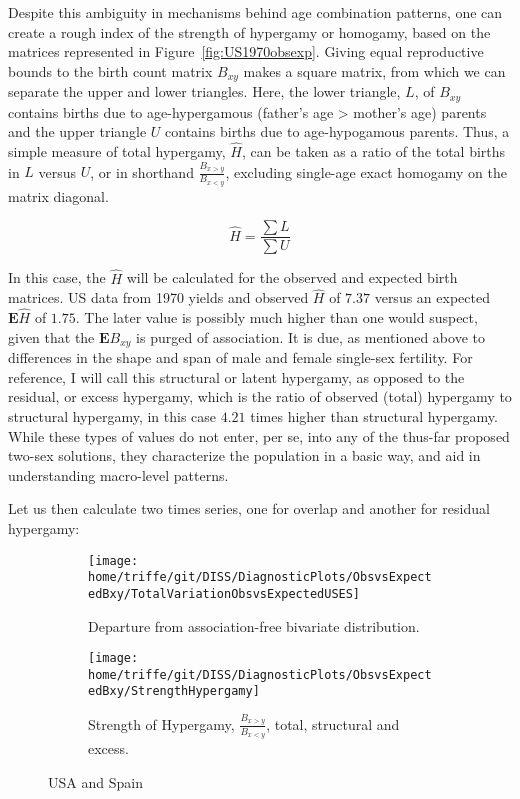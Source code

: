 Despite this ambiguity in mechanisms behind age combination patterns, one can
create a rough index of the strength of hypergamy or homogamy, based on the
matrices represented in Figure~\ref{fig:US1970obsexp}. Giving equal reproductive
bounds to the birth count matrix $B_{xy}$ makes a square matrix, from which we
can separate the upper and lower triangles. Here, the lower triangle, $L$,
of $B_{xy}$ contains births due to age-hypergamous (father's age > mother's age)
parents and the upper triangle $U$ contains births due to age-hypogamous parents. Thus, a simple
measure of total hypergamy, $\widehat{H}$, can be taken as a ratio of the total
births in $L$ versus $U$, or in shorthand $\frac{B_{x>y}}{B_{x<y}}$, excluding
single-age exact homogamy on the matrix diagonal.

\begin{equation}
\widehat{H} = \frac{\sum L}{\sum U} 
\end{equation}

In this case, the $\widehat{H}$ will be calculated for the observed and expected
birth matrices. US data from 1970 yields and observed $\widehat{H}$ of $7.37$
versus an expected $\textbf{E}\widehat{H}$ of $1.75$. The later value is
possibly much higher than one would suspect, given that the $\textbf{E}B_{xy}$
is purged of association. It is due, as mentioned above to differences in the
shape and span of male and female single-sex fertility. For reference, I
will call this structural or latent hypergamy, as opposed to the residual, or
excess hypergamy, which is the ratio of observed (total) hypergamy to
structural hypergamy, in this case $4.21$ times higher
than structural hypergamy. While these types of values do not enter, per se, 
into any of the thus-far proposed two-sex solutions, they characterize the 
population in a basic way, and aid in understanding macro-level patterns. 

Let us then calculate two times series, one for overlap and another for
residual hypergamy:

\begin{figure}
        \centering
        \begin{subfigure}[b]{0.9\textwidth}
                \centering
                 \caption{Departure from association-free bivariate
                 distribution. }
                \texttt{[image: home/triffe/git/DISS/DiagnosticPlots/ObsvsExpectedBxy/TotalVariationObsvsExpectedUSES]}
                \label{fig:Theta}
        \end{subfigure}
        \quad
        \begin{subfigure}[b]{0.9\textwidth}
                \centering
                \caption{Strength of Hypergamy, $\frac{B_{x>y}}{B_{x<y}}$,
                total, structural and excess. }
                \texttt{[image: home/triffe/git/DISS/DiagnosticPlots/ObsvsExpectedBxy/StrengthHypergamy]}
                
                \label{fig:HypergamyStrength}
        \end{subfigure}
        \caption{USA and Spain}\label{fig:obsexp}
\end{figure}








